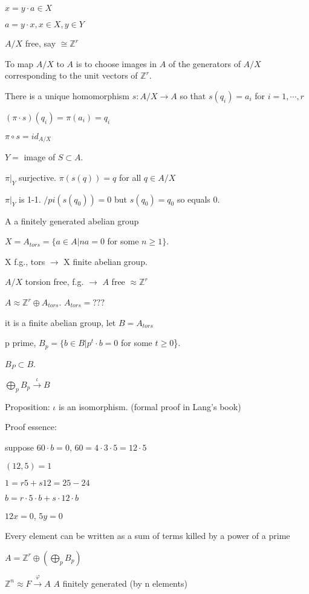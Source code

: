 \documentclass[12pt]{article}
\begin{document}
$x = y \cdot a \in X$

$a = y \cdot x, x\in X, y\in Y$

$A/X$ free, say $\cong \mathds{Z}^r$

To map $A/X$ to $A$ is to choose images in $A$ of the generators of $A/X$ corresponding to the unit vectors of $\mathds{Z}^r$.

There is a unique homomorphism $s: A/X \to A$ so that $s(q_i) = a_i$ for $i = 1, \cdots, r$

$(\pi \cdot s)(q_i) = \pi(a_i) = q_i$

$\pi \circ s = id_{A/X}$

$Y =$ image of $S \subset A$.

$\pi|_Y$ surjective.  $\pi(s(q)) = q$ for all $q \in A/X$

$\pi|_Y$ is 1-1.  $/pi(s(q_0)) = 0$ but $s(q_0) = q_0$ so equals 0.

\noindent
A a finitely generated abelian group

$X = A_{tors} = \{a \in A | na = 0$ for some $n \geq 1\}$.

X f.g., tors $\to$ X finite abelian group.

$A/X$ torsion free, f.g. $\to$ $A$ free $\approx \mathds{Z}^r$

\noindent
$A \approx \mathds{Z}^r \oplus A_{tors}$.  $A_{tors} = ???$

it is a finite abelian group, let $B = A_{tors}$

p prime, $B_p = \{b \in B | p^t \cdot b = 0$ for some $t \geq 0$\}.

$B_P \subset B$.

$\bigoplus_p B_p \xrightarrow{\iota} B$

Proposition: $\iota$ is an isomorphism. (formal proof in Lang's book)

\noindent
Proof essence:

suppose $60 \cdot b = 0$, $60 = 4 \cdot 3 \cdot 5 = 12 \cdot 5$

$(12, 5) = 1$

$1 = r5 + s12 = 25 - 24$

$b = r \cdot 5 \cdot b + s \cdot 12 \cdot b$

$12x = 0$, $5y = 0$

Every element can be written as a sum of terms killed by a power of a prime

\noindent
$A = \mathds{Z}^r \oplus (\bigoplus_p B_p)$

\noindent
$\mathds{Z}^n \approx F \xrightarrow{\varphi} A$ $A$ finitely generated (by n elements)
\end{document}
